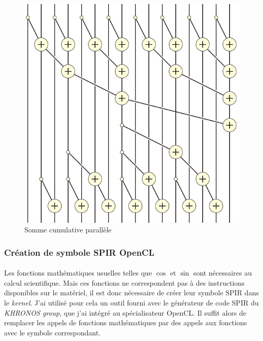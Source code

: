 \begin{figure}[h]
   \begin{center}
      \includegraphics[scale=0.3]{./images/prefix_sum.png}
   \end{center}
   \caption{Somme cumulative parallèle~\cite{prefix_sum}}
   \label{prefix_sum}
\end{figure}

\subsubsection{Création de symbole SPIR OpenCL}
\paragraph{}
Les fonctions mathématiques usuelles telles que $\cos$ et $\sin$ sont nécessaires
au calcul scientifique. Mais ces fonctions ne correspondent pas à des
instructions disponibles sur le matériel, il est donc nécessaire de créer leur
symbole SPIR dans le \emph{kernel}. J'ai utilisé pour cela un outil fourni avec
le générateur de code SPIR du \emph{KHRONOS group}, que j'ai intégré au
spécialisateur OpenCL. Il suffit alors de remplacer les appels de fonctions
mathématiques par des appels aux fonctions avec le symbole correspondant.

